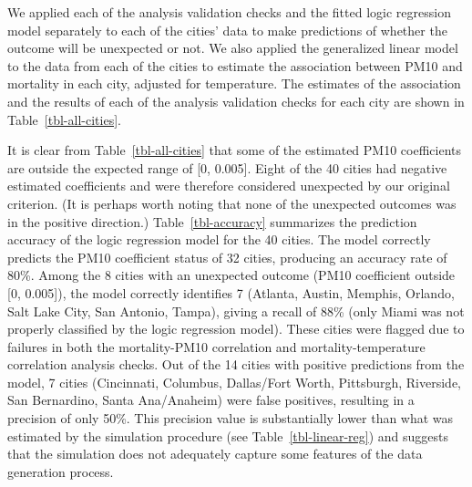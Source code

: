 \documentclass[
  12pt,
]{interact}
\begin{document}
We applied each of the analysis validation checks and the fitted logic
regression model separately to each of the cities' data to make
predictions of whether the outcome will be unexpected or not. We also
applied the generalized linear model to the data from each of the cities
to estimate the association between PM10 and mortality in each city,
adjusted for temperature. The estimates of the association and the
results of each of the analysis validation checks for each city are
shown in Table~\ref{tbl-all-cities}.

\begin{table}

\caption{\label{tbl-accuracy}Summary of the observed and the predicted
unexpected PM10 coefficient results from the 40 NMMAPS cities using the
logic regression model.}


\end{table}%

It is clear from Table~\ref{tbl-all-cities} that some of the estimated
PM10 coefficients are outside the expected range of {[}0, 0.005{]}.
Eight of the 40 cities had negative estimated coefficients and were
therefore considered unexpected by our original criterion. (It is
perhaps worth noting that none of the unexpected outcomes was in the
positive direction.) Table~\ref{tbl-accuracy} summarizes the prediction
accuracy of the logic regression model for the 40 cities. The model
correctly predicts the PM10 coefficient status of 32 cities, producing
an accuracy rate of 80\%. Among the 8 cities with an unexpected outcome
(PM10 coefficient outside {[}0, 0.005{]}), the model correctly
identifies 7 (Atlanta, Austin, Memphis, Orlando, Salt Lake City, San
Antonio, Tampa), giving a recall of 88\% (only Miami was not properly
classified by the logic regression model). These cities were flagged due
to failures in both the mortality-PM10 correlation and
mortality-temperature correlation analysis checks. Out of the 14 cities
with positive predictions from the model, 7 cities (Cincinnati,
Columbus, Dallas/Fort Worth, Pittsburgh, Riverside, San Bernardino,
Santa Ana/Anaheim) were false positives, resulting in a precision of
only 50\%. This precision value is substantially lower than what was
estimated by the simulation procedure (see Table~\ref{tbl-linear-reg})
and suggests that the simulation does not adequately capture some
features of the data generation process.
\end{document}
